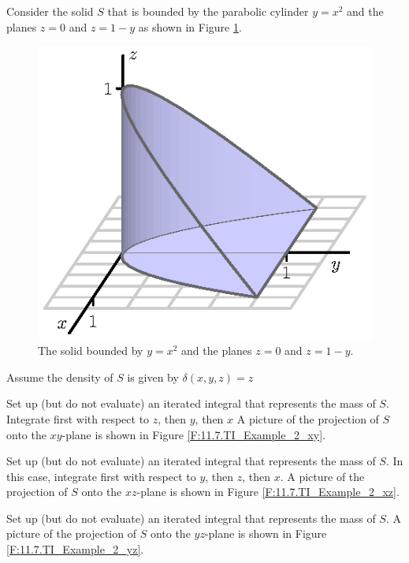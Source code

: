 \begin{activity} \label{A:11.7.5} Consider the solid $S$ that is bounded by the parabolic cylinder $y = x^2$ and the planes $z=0$ and $z=1-y$ as shown in Figure \ref{F:11.7.TI_Example_2}. 
\begin{figure}[ht]
\begin{center}
  \includegraphics{figures/fig_11_7_solid.eps}
\end{center}
\caption{The solid bounded by $y = x^2$ and the planes $z=0$ and $z=1-y$.}
\label{F:11.7.TI_Example_2}
\end{figure}

Assume the density of $S$ is given by $\delta(x,y,z) = z$
    \ba
    \item Set up (but do not evaluate) an iterated integral that represents the mass of $S$.  Integrate first with respect to $z$, then $y$, then $x$  A picture of the projection of $S$ onto the $xy$-plane is shown in Figure \ref{F:11.7.TI_Example_2_xy}.

    \item Set up (but do not evaluate) an iterated integral that represents the mass of $S$.  In this case, integrate first with respect to $y$, then $z$, then $x$.  A picture of the projection of $S$ onto the $xz$-plane is shown in Figure \ref{F:11.7.TI_Example_2_xz}.


	\item Set up (but do not evaluate) an iterated integral that represents the mass of $S$.  A picture of the projection of $S$ onto the $yz$-plane is shown in Figure \ref{F:11.7.TI_Example_2_yz}.


\end{activity}
